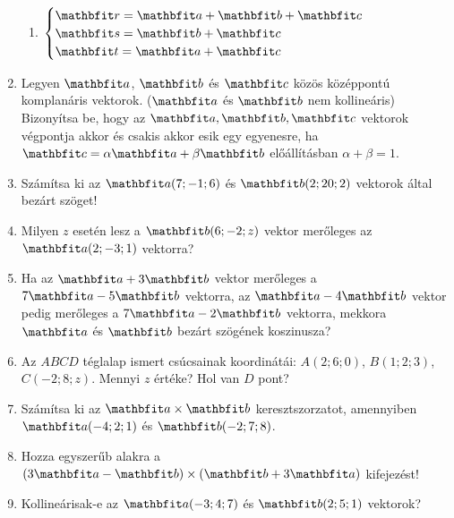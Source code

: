 \documentclass[a4paper, 12pt]{scrartcl}
\begin{document}
\begin{enumerate}
\begin{multicols}{2}
\begin{enumerate}
            \item $
                    \begin{cases}
                      \rvec r = \rvec a + \rvec b + \rvec c \\
                      \rvec s =           \rvec b + \rvec c \\
                      \rvec t = \rvec a           + \rvec c
                    \end{cases}
                  $
          \end{enumerate}
        \end{multicols}

  \item Legyen $\rvec a$, $\rvec b$ és $\rvec c$ közös középpontú komplanáris
        vektorok. ($\rvec a$ és $\rvec b$ nem kollineáris) Bizonyítsa be,
        hogy az $\rvec a, \rvec b, \rvec c$ vektorok végpontja akkor és csakis
        akkor esik egy egyenesre, ha $\rvec c = \alpha \rvec a + \beta \rvec b$
        előállításban $\alpha + \beta = 1$.

  \item Számítsa ki az $\rvec a (7; -1; 6)$ és $\rvec b (2; 20; 2)$
        vektorok által bezárt szöget!

  \item Milyen $z$ esetén lesz a $\rvec b(6; -2; z)$ vektor merőleges az
        $\rvec a(2; -3; 1)$ vektorra?

  \item Ha az $\rvec a + 3 \rvec b$ vektor merőleges a $7 \rvec a - 5 \rvec b$
        vektorra, az $\rvec a - 4 \rvec b$ vektor pedig merőleges a $7 \rvec a -
          2 \rvec b$ vektorra, mekkora $\rvec a$ és $\rvec b$ bezárt szögének
        koszinusza?

  \item Az $ABCD$ téglalap ismert csúcsainak koordinátái: $A(2; 6; 0)$, $B(1; 2;
          3)$, $C(-2; 8; z)$. Mennyi $z$ értéke? Hol van $D$ pont?

  \item Számítsa ki az $\rvec a \times \rvec b$ keresztszorzatot, amennyiben
        $\rvec a (-4; 2; 1)$ és $\rvec b (-2; 7; 8)$.

  \item Hozza egyszerűb alakra a $(3 \rvec a - \rvec b) \times (\rvec b +
          3 \rvec a)$ kifejezést!

  \item Kollineárisak-e az $\rvec a (-3; 4; 7)$ és $\rvec b (2; 5; 1)$ vektorok?


\end{enumerate}
\end{document}
